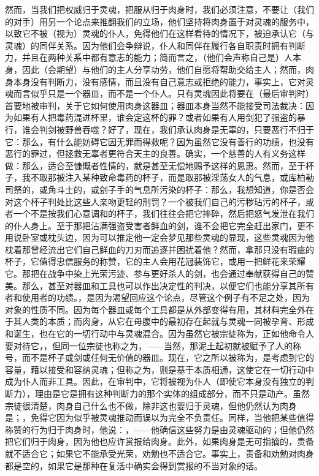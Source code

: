 然而，当我们把权威归于灵魂，把服从归于肉身时，我们必须注意，不要让（我们的对手）用另一个论点来推翻我们的立场，他们坚持将肉身置于对灵魂的服务中，以致它不被（视为）灵魂的仆人，免得他们在这样看待的情况下，被迫承认它（与灵魂）的同伴关系。因为他们会争辩说，仆人和同伴在履行各自职责时拥有判断力，并且在两种关系中都有意志的能力；简而言之，（他们会声称自己是）人本身，因此（会期望）与他们的主人分享功劳，他们自愿将帮助交给主人；然而，肉身本身没有判断力，没有感情，而且没有自己意志或拒绝的能力，事实上，它对灵魂而言似乎只是一个器皿，而不是一个仆人。只有灵魂因此将要在（最后审判时）首要地被审判，关于它如何使用肉身这器皿；器皿本身当然不能接受司法裁决：因为如果有人把毒药混进杯里，谁会定这杯的罪？或者如果有人用剑犯了强盗的暴行，谁会判剑被野兽吞噬？好了，现在，我们承认肉身是无辜的，只要恶行不归于它：那么，有什么能妨碍它因无罪而得救呢？因为虽然它没有善行的功绩，也没有恶行的罪过，但拯救无辜者更符合天主的良善。确实，一个慈善的人有义务这样做：那么，适合至慷慨者性情的，就是甚至无偿地赐予这样的恩惠。然而，至于杯子，我不取那被注入某种致命毒药的杯子，而是取那被淫荡女人的气息，或库柏勒司祭的，或角斗士的，或刽子手的气息所污染的杯子：那么，我想知道，你是否会对这个杯子判处比这些人亲吻更轻的刑罚？一个被我们自己的污秽玷污的杯子，或者一个不是按我们心意调和的杯子，我们往往会把它摔碎，然后把怒气发泄在我们的仆人身上。至于那把沾满强盗受害者鲜血的剑，谁不会把它完全赶出家门，更不用说卧室或枕头边，因为可以推定他一定会梦见那些灵魂的显现，这些灵魂因为他枕着那曾经流出它们自己鲜血的刀刃而追逐并困扰着他？然而，拿那只没有瑕疵的杯子，它值得忠信服务的称赞，它的主人会用花冠装饰它，或用一把鲜花来荣耀它。那把在战争中染上光荣污迹、参与更好杀人的剑，也会通过奉献获得自己的赞美。那么，甚至对器皿和工具也可以作出决定性的判决，以便它们也能分享其所有者和使用者的功绩。，是因为渴望回应这个论点，尽管这个例子有不足之处，因为对象的性质不同。因为每个器皿或每个工具都是从外部变得有用，其材料完全外在于其人类的本质；而肉身，从它在母腹中的最初存在起就与灵魂一同被孕育、形成和诞生，也在它的一切行动中与灵魂混合。因为虽然它被宗徒称为，正如他命令人要对待它，，但同一位宗徒也称之为，——当然，那泥土起初就被赋予了人的称号，而不是杯子或剑或任何无价值的器皿。现在，它之所以被称为，是考虑到它的容量，藉以接受和容纳灵魂；但称之为，则是基于本质相通，这使它在一切行动中成为仆人而非工具。因此，在审判中，它将被视为仆人（即使它本身没有独立的判断力），理由是它是拥有这种判断力的那个实体的组成部分，而不只是动产。虽然宗徒很清楚，肉身自己什么也不做，除非这也要归于灵魂，但他仍然认为肉身是；，免得它因为似乎被灵魂推动而误以为完全不负责任。同样，当他把某些值得称赞的行为归于肉身时，他说：，——他确信这些努力是由灵魂驱动的；但他仍然把它们归于肉身，因为他也应许赏报给肉身。此外，如果肉身是无可指摘的，责备就不适合它；如果它不能承受光荣，劝勉也不适合它。事实上，责备和劝勉对肉身都是空的，如果它是那种在复活中确实会得到赏报的不当对象的话。\par

